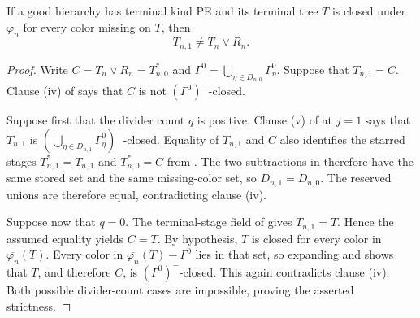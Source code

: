 \begin{lemma}
If a good hierarchy has terminal kind PE and its terminal tree $T$ is
closed under $\varphi_n$ for every color missing on $T$, then
\[
                     T_{n,1}\ne T_n\vee R_n.
\]
\end{lemma}
\begin{proof}
Write $C=T_n\vee R_n=T_{n,0}^{*}$ and
$\Gamma^0=\bigcup_{\eta\in D_{n,0}}\Gamma^0_\eta$.  Suppose that
$T_{n,1}=C$.  Clause (iv) of  says that $C$ is
not $(\Gamma^0)^{-}$-closed.

Suppose first that the divider count $q$ is positive.  Clause (v) of
 at $j=1$ says that
$T_{n,1}$ is
$(\bigcup_{\eta\in D_{n,1}}\Gamma^0_\eta)^{-}$-closed.  Equality of
$T_{n,1}$ and $C$ also identifies the starred stages
$T_{n,1}^{*}=T_{n,1}$ and $T_{n,0}^{*}=C$ from
.  The two subtractions in
 therefore have the same stored set and
the same missing-color set, so $D_{n,1}=D_{n,0}$.
The reserved unions are therefore equal, contradicting clause (iv).

Suppose now that $q=0$.  The terminal-stage field of
 gives $T_{n,1}=T$.  Hence the assumed
equality yields $C=T$.  By hypothesis, $T$ is closed for every color in
$\overline{\varphi_n}(T)$.  Every color in
$\overline{\varphi_n}(T)-\Gamma^0$ lies in that set, so expanding
 and 
shows that $T$, and therefore $C$, is $(\Gamma^0)^{-}$-closed.  This
again contradicts clause (iv).  Both possible divider-count cases are
impossible, proving the asserted strictness.
\end{proof}
